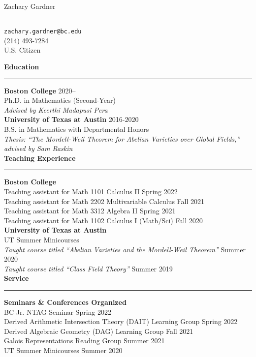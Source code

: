 \documentclass[11pt]{article}
\newenvironment{mysection}{
\color{mygreen}\bfseries\large
}
{
\\ \rule{\textwidth}{1pt}\hspace{-.25em}
} %
\begin{document}
\begin{center}
\begin{LARGE}Zachary Gardner\end{LARGE} \\
\vspace{1em}
\texttt{zachary.gardner@bc.edu} \\
(214) 493-7284 \\
U.S. Citizen \\
\end{center}

\begin{mysection}Education\end{mysection}
\textbf{Boston College} \hfill 2020-- \\
Ph.D. in Mathematics (Second-Year) \\
\textit{Advised by Keerthi Madapusi Pera} \\

\textbf{University of Texas at Austin} \hfill 2016-2020 \\
B.S. in Mathematics with Departmental Honors \\
\textit{Thesis: ``The Mordell-Weil Theorem for Abelian Varieties over Global Fields,'' advised by Sam Raskin} \\

\begin{mysection}Teaching Experience\end{mysection}
\textbf{Boston College} \\
Teaching assistant for Math 1101 Calculus II \hfill Spring 2022 \\
Teaching assistant for Math 2202 Multivariable Calculus \hfill Fall 2021 \\
Teaching assistant for Math 3312 Algebra II \hfill Spring 2021 \\
Teaching assistant for Math 1102 Calculus I (Math/Sci) \hfill Fall 2020 \\

\textbf{University of Texas at Austin} \\
UT Summer Minicourses \\
\textit{Taught course titled ``Abelian Varieties and the Mordell-Weil Theorem''} \hfill Summer 2020 \\
\textit{Taught course titled ``Class Field Theory''} \hfill Summer 2019 \\

\begin{mysection}Service \end{mysection}
\textbf{Seminars \& Conferences Organized} \\
BC Jr. NTAG Seminar \hfill Spring 2022 \\
Derived Arithmetic Intersection Theory (DAIT) Learning Group \hfill Spring 2022 \\
Derived Algebraic Geometry (DAG) Learning Group \hfill Fall 2021 \\
Galois Representations Reading Group \hfill Summer 2021 \\
UT Summer Minicourses \hfill Summer 2020 \\
\end{document}
